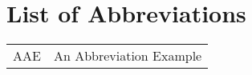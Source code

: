 \chapter{List of Abbreviations}

\begin{longtable}[H]{p{}  p{} }

AAE & An Abbreviation Example \\
\end{longtable}
